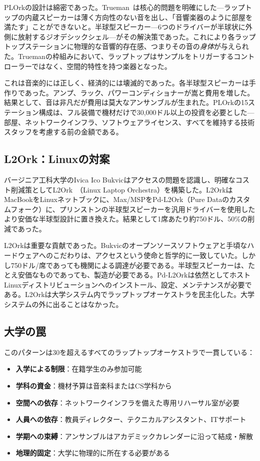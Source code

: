 \documentclass[10pt,letterpaper,twocolumn]{article}
\begin{document}
PLOrkの設計は綿密であった。Trueman~\citep{trueman2007why}は核心的問題を明確にした---ラップトップの内蔵スピーカーは薄く方向性のない音を出し、「音響楽器のように部屋を満たす」ことができないと。半球型スピーカー---6つのドライバーが半球状に外側に放射するジオデシックシェル---がその解決策であった。これにより各ラップトップステーションに物理的な音響的存在感、つまりその音の\emph{身体}が与えられた。Truemanの枠組みにおいて、ラップトップはサンプルをトリガーするコントローラーではなく、空間的特性を持つ楽器となった。

これは音楽的には正しく、経済的には壊滅的であった。各半球型スピーカーは手作りであった。アンプ、ラック、パワーコンディショナーが嵩と費用を増した。結果として、音は非凡だが費用は莫大なアンサンブルが生まれた。PLOrkの15ステーション構成は、フル装備で機材だけで30,000ドル以上の投資を必要とした---部屋、ネットワークインフラ、ソフトウェアライセンス、すべてを維持する技術スタッフを考慮する前の金額である。

\subsection{L2Ork：Linuxの対案}

バージニア工科大学のIvica Ico Bukvicはアクセスの問題を認識し、明確なコスト削減策としてL2Ork~\citep{bukvic2010l2ork}（Linux Laptop Orchestra）を構築した。L2OrkはMacBookをLinuxネットブックに、Max/MSPをPd-L2Ork（Pure Dataのカスタムフォーク）に、プリンストンの半球型スピーカーを汎用ドライバーを使用したより安価な半球型設計に置き換えた。結果として1席あたり約750ドル、50\%の削減であった。

L2Orkは重要な貢献であった。Bukvicのオープンソースソフトウェアと手頃なハードウェアへのこだわりは、アクセスという使命と哲学的に一致していた。しかし750ドル/席であっても機関による調達が必要である。半球型スピーカーは、たとえ安価なものであっても、製造が必要である。Pd-L2Orkは依然としてホストLinuxディストリビューションへのインストール、設定、メンテナンスが必要である。L2Orkは大学システム内でラップトップオーケストラを民主化した。大学システムの外に出ることはなかった。

\subsection{大学の罠}

このパターンは30を超えるすべてのラップトップオーケストラで一貫している：

\begin{itemize}
  \item \textbf{入学による制限}：在籍学生のみ参加可能
  \item \textbf{学科の資金}：機材予算は音楽科またはCS学科から
  \item \textbf{空間への依存}：ネットワークインフラを備えた専用リハーサル室が必要
  \item \textbf{人員への依存}：教員ディレクター、テクニカルアシスタント、ITサポート
  \item \textbf{学期への束縛}：アンサンブルはアカデミックカレンダーに沿って結成・解散
  \item \textbf{地理的固定}：大学に物理的に所在する必要がある
\end{itemize}
\end{document}
